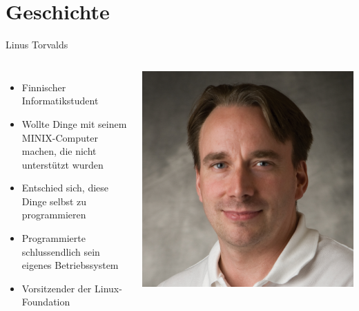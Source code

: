 \documentclass[10pt]{beamer}
\begin{document}
\section{Geschichte}
\begin{frame}{Linus Torvalds}
	\begin{columns}
		 	\begin{itemize}[<+- | alert@+>]
		 		\item Finnischer Informatikstudent
		 		\item Wollte Dinge mit seinem MINIX-Computer machen, die nicht unterstützt wurden
		 		\item Entschied sich, diese Dinge selbst zu programmieren
		 		\item Programmierte schlussendlich sein eigenes Betriebssystem
		 		\item Vorsitzender der Linux-Foundation
		 	\end{itemize}
	 		\includegraphics[scale=0.25]{img/torvalds.png}
	\end{columns}
\end{frame}

\end{document}
